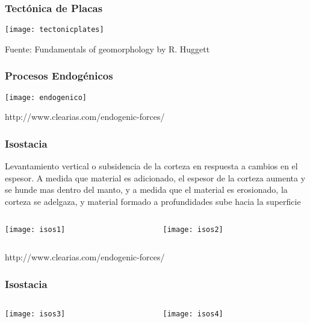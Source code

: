 \documentclass{beamer}
\begin{document}
\begin{frame}
\frametitle{Tectónica de Placas}
\begin{center}
\texttt{[image: tectonicplates]}
\end{center}
\tiny{Fuente: Fundamentals of geomorphology by R. Huggett}
\end{frame}
\begin{frame}
\frametitle{Procesos Endogénicos}
\begin{center}
\texttt{[image: endogenico]}
\end{center}
\tiny{http://www.clearias.com/endogenic-forces/}
\end{frame}
\begin{frame}
\frametitle{Isostacia}
\begin{center}
\justifying
\small{Levantamiento vertical o subsidencia de la corteza en respuesta a cambios en el espesor. A medida que material es adicionado, el espesor de la corteza aumenta y se hunde mas dentro del manto, y a medida que el material es erosionado, la corteza se adelgaza, y material formado a profundidades sube hacia la superficie}
\begin{columns}
		\begin{column}{.5\linewidth}
		 \texttt{[image: isos1]}
		\end{column}
		\begin{column}{.5\linewidth}
			 \texttt{[image: isos2]}
		\end{column}
\end{columns}
\end{center}
\tiny{http://www.clearias.com/endogenic-forces/}
\end{frame}
\begin{frame}
\frametitle{Isostacia}
\begin{center}
\begin{columns}
		\begin{column}{.3\linewidth}
		 \texttt{[image: isos3]}
		\end{column}
		\begin{column}{.7\linewidth}
			 \texttt{[image: isos4]}
		\end{column}
\end{columns}
\end{center}
\end{frame}
\end{document}
